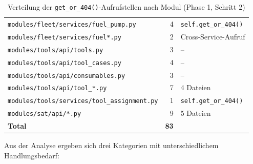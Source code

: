 \begin{table}[H]
\begin{center}
\begin{tabular}{|l|r|l|}
            \texttt{modules/fleet/services/fuel\_pump.py}        & 4                & \texttt{self.get\_or\_404()}              \\
            \texttt{modules/fleet/services/fuel*.py}             & 2                & Cross-Service-Aufruf                      \\
            \hline
            \texttt{modules/tools/api/tools.py}                  & 3                & --                                        \\
            \texttt{modules/tools/api/tool\_cases.py}            & 4                & --                                        \\
            \texttt{modules/tools/api/consumables.py}            & 3                & --                                        \\
            \texttt{modules/tools/api/tool\_*.py}                & 7                & 4 Dateien                                 \\
            \texttt{modules/tools/services/tool\_assignment.py}  & 1                & \texttt{self.get\_or\_404()}              \\
            \hline
            \texttt{modules/sat/api/*.py}                        & 9                & 5 Dateien                                 \\
            \hline
            \textbf{Total}                                       & \textbf{83}      &                                           \\
            \hline
        \end{tabular}
    \end{center}
    \caption{Verteilung der \texttt{get\_or\_404()}-Aufrufstellen nach Modul (Phase 1, Schritt 2)}
    \label{tab:callers_summary}
\end{table}

Aus der Analyse ergeben sich drei Kategorien mit unterschiedlichem Handlungsbedarf:


